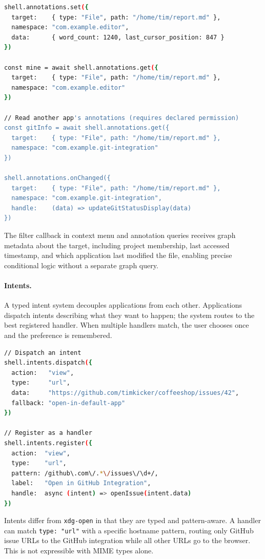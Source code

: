 \begin{lstlisting}[language=bash, caption={shell.annotations}]
shell.annotations.set({
  target:    { type: "File", path: "/home/tim/report.md" },
  namespace: "com.example.editor",
  data:      { word_count: 1240, last_cursor_position: 847 }
})

const mine = await shell.annotations.get({
  target:    { type: "File", path: "/home/tim/report.md" },
  namespace: "com.example.editor"
})

// Read another app's annotations (requires declared permission)
const gitInfo = await shell.annotations.get({
  target:    { type: "File", path: "/home/tim/report.md" },
  namespace: "com.example.git-integration"
})

shell.annotations.onChanged({
  target:    { type: "File", path: "/home/tim/report.md" },
  namespace: "com.example.git-integration",
  handle:    (data) => updateGitStatusDisplay(data)
})
\end{lstlisting}

The filter callback in context menu and annotation queries receives graph
metadata about the target, including project membership, last accessed timestamp,
and which application last modified the file, enabling precise conditional
logic without a separate graph query.

\paragraph{Intents.}
A typed intent system decouples applications from each other. Applications
dispatch intents describing what they want to happen; the system routes to
the best registered handler. When multiple handlers match, the user chooses
once and the preference is remembered.

\begin{lstlisting}[language=bash, caption={shell.intents}]
// Dispatch an intent
shell.intents.dispatch({
  action:   "view",
  type:     "url",
  data:     "https://github.com/timkicker/coffeeshop/issues/42",
  fallback: "open-in-default-app"
})

// Register as a handler
shell.intents.register({
  action:  "view",
  type:    "url",
  pattern: /github\.com\/.*\/issues\/\d+/,
  label:   "Open in GitHub Integration",
  handle:  async (intent) => openIssue(intent.data)
})
\end{lstlisting}

Intents differ from \texttt{xdg-open} in that they are typed and
pattern-aware. A handler can match \texttt{type: "url"} with a specific
hostname pattern, routing only GitHub issue URLs to the GitHub integration
while all other URLs go to the browser. This is not expressible with MIME
types alone.

